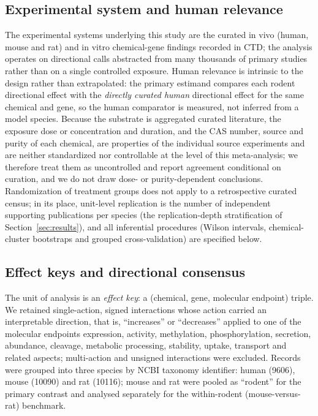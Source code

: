 \documentclass[review,12pt,authoryear]{elsarticle}
\begin{document}
\subsection{Experimental system and human relevance}

The experimental systems underlying this study are the curated in vivo (human,
mouse and rat) and in vitro chemical-gene findings recorded in CTD; the analysis
operates on directional calls abstracted from many thousands of primary studies
rather than on a single controlled exposure. Human relevance is intrinsic to the
design rather than extrapolated: the primary estimand compares each rodent
directional effect with the \emph{directly curated human} directional effect for
the same chemical and gene, so the human comparator is measured, not inferred
from a model species. Because the substrate is aggregated curated literature, the
exposure dose or concentration and duration, and the CAS number, source and
purity of each chemical, are properties of the individual source experiments and
are neither standardized nor controllable at the level of this meta-analysis; we
therefore treat them as uncontrolled and report agreement conditional on
curation, and we do not draw dose- or purity-dependent conclusions. Randomization
of treatment groups does not apply to a retrospective curated census; in its
place, unit-level replication is the number of independent supporting
publications per species (the replication-depth stratification of
Section~\ref{sec:results}), and all inferential procedures (Wilson intervals,
chemical-cluster bootstraps and grouped cross-validation) are specified below.

\subsection{Effect keys and directional consensus}

The unit of analysis is an \emph{effect key}: a (chemical, gene, molecular
endpoint) triple. We retained single-action, signed interactions whose action
carried an interpretable direction, that is, ``increases'' or ``decreases''
applied to one of the molecular endpoints expression, activity, methylation,
phosphorylation, secretion, abundance, cleavage, metabolic processing,
stability, uptake, transport and related aspects; multi-action and unsigned
interactions were excluded. Records were grouped into three species by NCBI
taxonomy identifier: human (9606), mouse (10090) and rat (10116); mouse and rat
were pooled as ``rodent'' for the primary contrast and analysed separately for
the within-rodent (mouse-versus-rat) benchmark.
\end{document}
